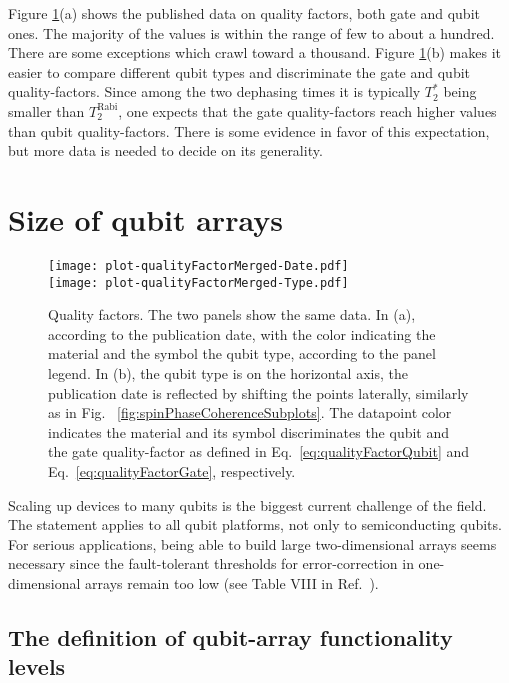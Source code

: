 \documentclass[aps, prx, showpacs, twocolumn, superscriptaddress, notitlepage, longbibliography, floatfix, nofootinbib]{revtex4-2}
\newcommand{\TRabi}{T_2^\mathrm{Rabi}}
\newcommand{\recheck}[1]{{#1}}
\begin{document}
Figure \ref{fig:qualityFactor}(a) shows the published data on quality factors, both gate and qubit ones. \recheck{The majority of the values is within the range of few to about a hundred. There are some exceptions which crawl toward a thousand.} Figure \ref{fig:qualityFactor}(b) makes it easier to compare different qubit types and discriminate the gate and qubit quality-factors. 
Since among the two dephasing times it is typically $T_2^*$ being smaller than $ \TRabi$, \recheck{one expects that the gate quality-factors reach higher values  than qubit quality-factors.
There is some evidence in favor of this expectation, but more data is needed to decide on its generality.}


\section{Size of qubit arrays}

\begin{figure}
  \texttt{[image: plot-qualityFactorMerged-Date.pdf]}\\
    \texttt{[image: plot-qualityFactorMerged-Type.pdf]}
 \caption{
  \label{fig:qualityFactor}
Quality factors. The two panels show the same data. In (a), according to the publication date, with the color indicating the material and the symbol the qubit type, according to the panel legend. In (b), the qubit type is on the horizontal axis, the publication date is reflected by shifting the points laterally, similarly as in Fig. ~\ref{fig:spinPhaseCoherenceSubplots}. The datapoint color indicates the material and its symbol discriminates the qubit and the gate quality-factor as defined in Eq.~\eqref{eq:qualityFactorQubit} and Eq.~\eqref{eq:qualityFactorGate}, respectively.
  }
\end{figure}



\label{sec:size}

Scaling up devices to many qubits is the biggest current challenge of the field. The statement applies to all qubit platforms, not only to semiconducting qubits. For serious applications, being able to build large two-dimensional arrays seems necessary since the fault-tolerant thresholds for error-correction in one-dimensional arrays remain too low (see Table VIII in Ref.~\cite{devitt_quantum_2013}). 

\subsection{The definition of qubit-array functionality levels}
\end{document}
